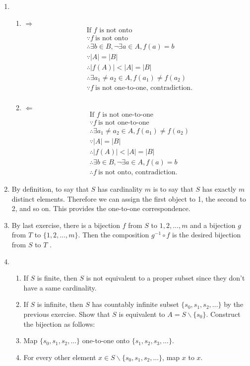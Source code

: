 \documentclass{sig-alternate-05-2015}
\begin{document}
\begin{enumerate}
\item 
\begin{enumerate}
	\item $\Rightarrow$
		\begin{align}
			&\text{If $f$ is not onto}\\
			&\because f\ \text{is not onto}\\
			&\therefore \exists b \in B, \neg \exists a \in A, f(a) = b\\
			&\because |A| = |B|\\
			&\therefore |f(A)| < |A| = |B|\\
			&\therefore \exists a_1 \ne a_2 \in A, f(a_1) \ne f(a_2)\\
			&\because f\ \text{is not one-to-one, contradiction.}\\
		\end{align}
	\item $\Leftarrow$
		\begin{align}
			&\text{If $f$ is not one-to-one}\\
			&\because f\ \text{is not one-to-one}\\
			&\therefore \exists a_1 \ne a_2 \in A, f(a_1) \ne f(a_2)\\
			&\because |A| = |B|\\
			&\therefore |f(A)| < |A| = |B|\\
			&\therefore \exists b \in B, \neg \exists a \in A, f(a) = b\\
			&\therefore f\ \text{is not onto, contradiction.}
		\end{align}
\end{enumerate}

\item By definition, to say that $S$ has cardinality
$m$ is to say that $S$ has exactly $m$ distinct elements. Therefore
we can assign the first object to 1, the second to 2, and so on.
This provides the one-to-one correspondence.

\item By last exercise, there is a bijection $f$ from $S$ to ${1, 2, . . . , m}$ and a bijection $g$ from $T$ to $\{1, 2, . . . , m\}$. Then the composition $g^{-1} \circ f$ is
the desired bijection from $S$ to $T$ .

\item 
\begin{enumerate}
	\item If $S$ is finite, then $S$ is not equivalent to a proper subset since they don\textquoteright t have a same cardinality.
	\item If $S$ is infinite, then $S$ has countably infinite subset $\{s_0, s_1, s_2, ...\}$ by the previous exercise. Show that $S$ is
	equivalent to $A = S \backslash \{s_0\}$. Construct the bijection as follows:
	\item Map $\{s_0, s_1, s_2, ...\}$ one-to-one onto $\{s_1, s_2, s_3, ...\}$. 
	\item For every other element $x \in S \backslash \{s_0, s_1, s_2, ...\}$, map $x$ to $x$.
\end{enumerate}
\end{enumerate}
\end{document}
